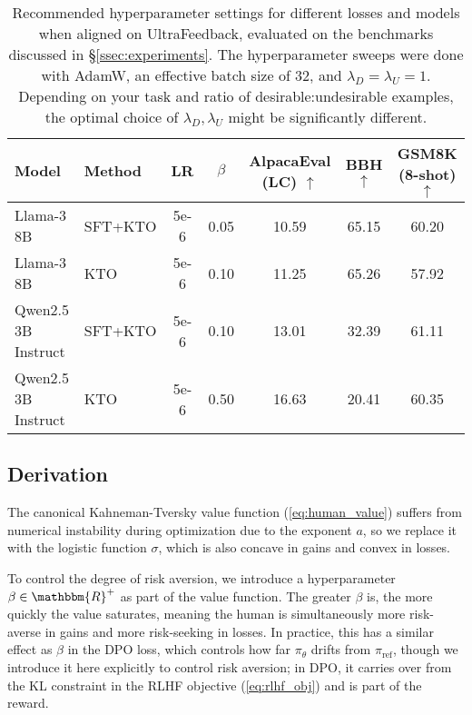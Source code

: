 \begin{table*}[t]
    \small 
    \centering
    \caption{
        Recommended hyperparameter settings for different losses and models when aligned on UltraFeedback, evaluated on the benchmarks discussed in \S\ref{ssec:experiments}.
        The hyperparameter sweeps were done with AdamW, an effective batch size of 32, and $\lambda_D = \lambda_U = 1$. 
        Depending on your task and ratio of desirable:undesirable examples, the optimal choice of $\lambda_D, \lambda_U$ might be significantly different.
    }
    \begin{tabular*}{\textwidth}{@{\extracolsep{\fill}}llccccc@{}}
        \toprule
        Model & Method & LR & $\beta$ & AlpacaEval (LC) $\uparrow$ & BBH $\uparrow$ & GSM8K (8-shot) $\uparrow$ \\
        \midrule
        Llama-3 8B & SFT+KTO & 5e-6 & 0.05 & 10.59 & 65.15 & 60.20 \\
        Llama-3 8B & KTO & 5e-6 & 0.10 & 11.25 & 65.26 & 57.92 \\
        Qwen2.5 3B Instruct & SFT+KTO & 5e-6 & 0.10 & 13.01 & 32.39 & 61.11 \\
        Qwen2.5 3B Instruct & KTO & 5e-6 & 0.50 & 16.63 & 20.41 & 60.35 \\
        \bottomrule
    \end{tabular*}
    \label{tab:hparams}
\end{table*}

\subsection{Derivation}
\label{ssec:kto}

The canonical Kahneman-Tversky value function (\ref{eq:human_value}) suffers from numerical instability during optimization due to the exponent $a$, so we replace it with the logistic function $\sigma$, which is also concave in gains and convex in losses.

To control the degree of risk aversion, we introduce a hyperparameter $\beta \in \mathbbm{R}^+$ as part of the value function.
The greater $\beta$ is, the more quickly the value saturates, meaning the human is simultaneously more risk-averse in gains and more risk-seeking in losses.
In practice, this has a similar effect as $\beta$ in the DPO loss, which controls how far $\pi_\theta$ drifts from $\pi_\text{ref}$, though we introduce it here explicitly to control risk aversion; in DPO, it carries over from the KL constraint in the RLHF objective (\ref{eq:rlhf_obj}) and is part of the reward.


